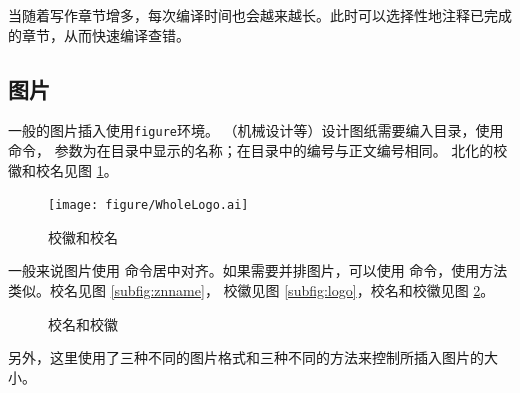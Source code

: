     当随着写作章节增多，每次编译时间也会越来越长。此时可以选择性地注释已完成的章节，从而快速编译查错。

    \subsection{图片}\label{subsec:fig}
        一般的图片插入使用\texttt{figure}环境。
		（机械设计等）设计图纸需要编入目录，使用命令，
		参数为在目录中显示的名称；在目录中的编号与正文编号相同。
        北化的校徽和校名见图 \ref{fig:WholeLogo}。

        \begin{figure}[H]
            \centering
            \texttt{[image: figure/WholeLogo.ai]}
            \caption{校徽和校名}
            \label{fig:WholeLogo}
        \end{figure}

		一般来说图片使用 命令居中对齐。如果需要并排图片，可以使用
		命令，使用方法类似。校名见图 \ref{subfig:znname}，
		校徽见图 \ref{subfig:logo}，校名和校徽见图 \ref{fig:wholelogo}。
	        \begin{figure}[H]
            \centering
            \hspace{1cm}
            \caption{校名和校徽}
            \label{fig:wholelogo}
        \end{figure}
        另外，这里使用了三种不同的图片格式和三种不同的方法来控制所插入图片的大小。


